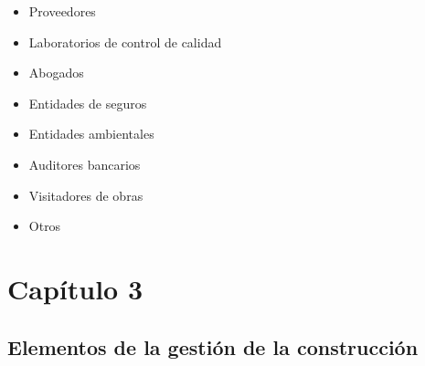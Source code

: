 \documentclass{article} %
\begin{document}
\begin{itemize}[label={},left=0pt,align=parleft]
\begin{itemize}[label={},left=1em,align=parleft]
        \item \begin{highlightbox}[leveltwo] Proveedores \end{highlightbox}
        \item \begin{highlightbox}[leveltwo] Laboratorios de control de calidad \end{highlightbox}
        \item \begin{highlightbox}[leveltwo] Abogados \end{highlightbox}
        \item \begin{highlightbox}[leveltwo] Entidades de seguros \end{highlightbox}
        \item \begin{highlightbox}[leveltwo] Entidades ambientales \end{highlightbox}
        \item \begin{highlightbox}[leveltwo] Auditores bancarios \end{highlightbox}
        \item \begin{highlightbox}[leveltwo] Visitadores de obras \end{highlightbox}
        \item \begin{highlightbox}[leveltwo] Otros \end{highlightbox}
    \end{itemize}
\end{itemize}

\newpage 
\section{Capítulo 3}

\subsection{Elementos de la gestión de la construcción}
\end{document}
